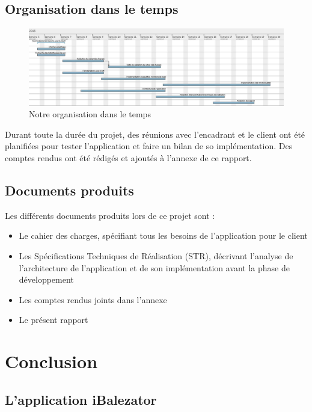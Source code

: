 \documentclass{scrreprt}
\begin{document}
\section{Organisation dans le temps}


\begin{figure}[!ht]
      \includegraphics[width=\textwidth]{images/gantt.png}
      \caption{Notre organisation dans le temps}
\end{figure}

Durant toute la durée du projet, des réunions avec l'encadrant et le client ont été planifiées pour tester l'application et faire un bilan de so implémentation. Des comptes rendus ont été rédigés et ajoutés à l'annexe de ce rapport.

\section{Documents produits}

\noindent Les différents documents produits lors de ce projet sont :
\begin{itemize}
	\item Le cahier des charges, spécifiant tous les besoins de l'application pour le client
	\item Les Spécifications Techniques de Réalisation (STR), décrivant l'analyse de l'architecture de l'application et de son implémentation avant la phase de développement
	\item Les comptes rendus joints dans l'annexe
	\item Le présent rapport
\end{itemize}


\chapter{Conclusion}

\section{L'application iBalezator}
\end{document}
